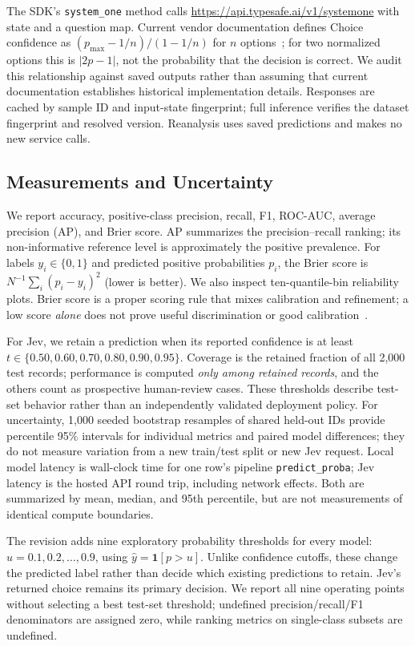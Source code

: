 \documentclass{llncs}
\begin{document}
The SDK's \texttt{system\_one} method calls \url{https://api.typesafe.ai/v1/systemone} with state and a question map. Current vendor documentation defines Choice confidence as $(p_{\max}-1/n)/(1-1/n)$ for $n$ options~\cite{typesafe2026confidence}; for two normalized options this is $|2p-1|$, not the probability that the decision is correct. We audit this relationship against saved outputs rather than assuming that current documentation establishes historical implementation details. Responses are cached by sample ID and input-state fingerprint; full inference verifies the dataset fingerprint and resolved version. Reanalysis uses saved predictions and makes no new service calls.

\subsection{Measurements and Uncertainty}

We report accuracy, positive-class precision, recall, F1, ROC-AUC, average precision (AP), and Brier score. AP summarizes the precision--recall ranking; its non-informative reference level is approximately the positive prevalence. For labels $y_i\in\{0,1\}$ and predicted positive probabilities $p_i$, the Brier score is $N^{-1}\sum_i(p_i-y_i)^2$ (lower is better). We also inspect ten-quantile-bin reliability plots. Brier score is a proper scoring rule that mixes calibration and refinement; a low score \emph{alone} does not prove useful discrimination or good calibration~\cite{chidambaram2025reassessing}.

For Jev, we retain a prediction when its reported confidence is at least $t\in\{0.50,0.60,0.70,0.80,0.90,0.95\}$. Coverage is the retained fraction of all 2,000 test records; performance is computed \emph{only among retained records}, and the others count as prospective human-review cases. These thresholds describe test-set behavior rather than an independently validated deployment policy. For uncertainty, 1,000 seeded bootstrap resamples of shared held-out IDs provide percentile 95\% intervals for individual metrics and paired model differences; they do not measure variation from a new train/test split or new Jev request. Local model latency is wall-clock time for one row's pipeline \texttt{predict\_proba}; Jev latency is the hosted API round trip, including network effects. Both are summarized by mean, median, and 95th percentile, but are not measurements of identical compute boundaries.

The revision adds nine exploratory probability thresholds for every model: $u=0.1,0.2,\ldots,0.9$, using $\hat y=\mathbf{1}[p>u]$. Unlike confidence cutoffs, these change the predicted label rather than decide which existing predictions to retain. Jev's returned choice remains its primary decision. We report all nine operating points without selecting a best test-set threshold; undefined precision/recall/F1 denominators are assigned zero, while ranking metrics on single-class subsets are undefined.
\end{document}
